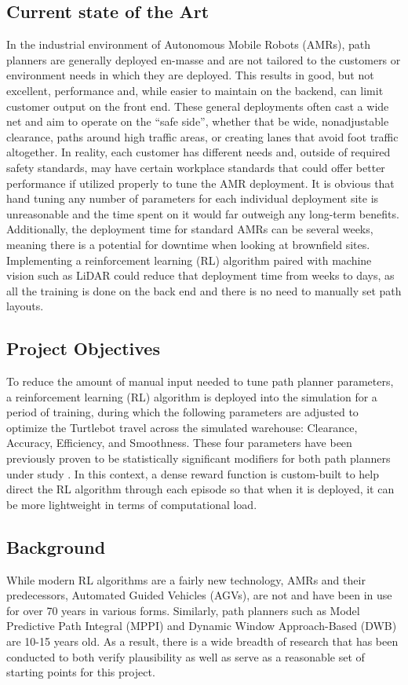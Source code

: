 \documentclass[conference]{IEEEtran}
\begin{document}
    \subsection{Current state of the Art}
    In the industrial environment of Autonomous Mobile Robots (AMRs), path planners are generally deployed en-masse and are not tailored to the
    customers or environment needs in which they are deployed. This results in good, but not excellent, performance and, while easier to maintain on
    the backend, can limit customer output on the front end. These general deployments often cast a wide net and aim to operate on the ``safe side'',
    whether that be wide, nonadjustable clearance, paths around high traffic areas, or creating lanes that avoid foot traffic altogether. In reality,
    each customer has different needs and, outside of required safety standards, may have certain workplace standards that could offer better
    performance if utilized properly to tune the AMR deployment. It is obvious that hand tuning any number of parameters for each individual
    deployment site is unreasonable and the time spent on it would far outweigh any long-term benefits. Additionally, the deployment time for
    standard AMRs can be several weeks, meaning there is a potential for downtime when looking at brownfield sites. Implementing a reinforcement
    learning (RL) algorithm paired with machine vision such as LiDAR could reduce that deployment time from weeks to days, as all the training is
    done on the back end and there is no need to manually set path layouts.
    
    \subsection{Project Objectives}
    To reduce the amount of manual input needed to tune path planner parameters, a reinforcement learning (RL) algorithm is deployed into the simulation for a period of
    training, during which the following parameters are adjusted to optimize the Turtlebot travel across the simulated warehouse: Clearance, Accuracy,
    Efficiency, and Smoothness. These four parameters have been previously proven to be statistically significant modifiers for both path planners 
    under study \cite{b1} \cite{b2}. In this context, a dense reward function is custom-built to help direct the RL algorithm through each episode so
    that when it is deployed, it can be more lightweight in terms of computational load.

    \subsection{Background}
    While modern RL algorithms are a fairly new technology, AMRs and their predecessors, Automated Guided Vehicles (AGVs), are not and have been in
    use for over 70 years in various forms. Similarly, path planners such as Model Predictive Path Integral (MPPI) and Dynamic Window Approach-Based
    (DWB) are 10-15 years old. As a result, there is a wide breadth of research that has been conducted to both verify plausibility as well as serve
    as a reasonable set of starting points for this project.
        
\end{document}
